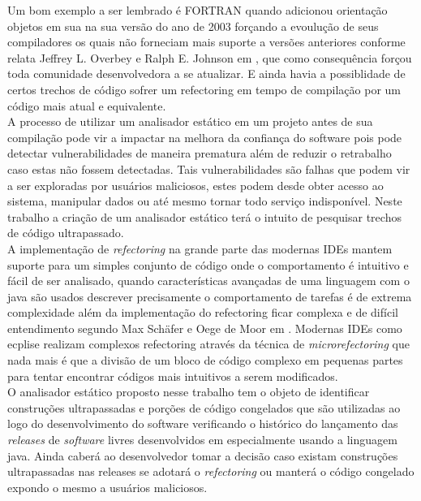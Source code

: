 Um bom exemplo a ser lembrado é FORTRAN quando adicionou orientação objetos em sua na sua versão do ano de 2003 forçando a evoulução de seus compiladores os quais não forneciam mais suporte a versões anteriores conforme relata Jeffrey L. Overbey e Ralph E. Johnson em  \cite{Overbey:2009:RLR:1639949.1640127}, que como consequência forçou toda comunidade desenvolvedora a se atualizar. E ainda havia a possiblidade de certos trechos de código sofrer um refectoring em tempo de compilação por um código mais atual e equivalente.\\

A processo de utilizar um analisador estático em um projeto antes de sua compilação pode vir a impactar na melhora da confiança do software pois pode detectar vulnerabilidades de maneira prematura além de reduzir o retrabalho caso estas não fossem detectadas. Tais vulnerabilidades são falhas que podem vir a ser exploradas por usuários maliciosos, estes podem desde obter acesso ao sistema, manipular dados ou até mesmo tornar todo serviço indisponível. Neste trabalho a criação de um analisador estático terá o intuito de pesquisar trechos de código ultrapassado.\\

A implementação de {\it refectoring} na grande parte das modernas IDEs mantem suporte para um simples conjunto de código onde o comportamento é intuitivo e fácil de ser analisado,  quando características avançadas de uma linguagem com o java são usados descrever precisamente o comportamento de tarefas é de extrema complexidade além da implementação do refectoring ficar complexa e de difícil entendimento segundo Max Schäfer e Oege de Moor em  \cite{Schaefer:2010:SIR:1932682.1869485}. Modernas IDEs como ecplise realizam complexos refectoring através da técnica de {\it microrefectoring} que nada mais é que a divisão de um bloco de código complexo em pequenas partes para tentar encontrar códigos mais intuitivos a serem modificados.\\

O analisador estático proposto nesse trabalho tem o objeto de identificar construções ultrapassadas e porções de código congelados que são utilizadas ao logo do desenvolvimento do software verificando o histórico do lançamento das {\it releases} de {\it software} livres desenvolvidos em especialmente usando a linguagem java. Ainda caberá ao desenvolvedor tomar a decisão caso existam construções ultrapassadas nas releases se adotará o {\it refectoring} ou manterá o código congelado expondo o mesmo a usuários maliciosos.\\




